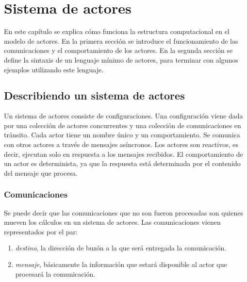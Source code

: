 \chapter{Sistema de actores}

\newcommand{\COMUNICACIONES}{\mathcal{K}}
\newcommand{\COMUNICACIONESSUB}{\mathsf{K}}

\newcommand{\COMUNICACION}{\bar{k}}
\newcommand{\BUZONES}{\mathcal{B}}
\newcommand{\BUZONESSUB}{\mathsf{B}}
\newcommand{\BUZON}{\beta}
\newcommand{\MENSAJES}{\mathcal{M}}
\newcommand{\MENSAJE}{m}

\newcommand{\ACTOR}{\alpha}
\newcommand{\COMPORTAMIENTOS}{\mathcal{C}}
\newcommand{\COMPORTAMIENTOSSUB}{\mathsf{C}}

\newcommand{\COMPORTAMIENTO}{c}
\newcommand{\COMNOPROC}{\kappa}

En este capítulo se explica cómo funciona la estructura computacional en el modelo de actores. En la primera sección se introduce el funcionamiento de las comunicaciones y el comportamiento de los actores. En la segunda sección se define la sintaxis de un lenguaje mínimo de actores, para terminar con algunos ejemplos utilizando este lenguaje.

\section{Describiendo un sistema de actores}
Un sistema de actores consiste de configuraciones. Una configuración viene dada por una colección de actores concurrentes y una colección de comunicaciones en tránsito. Cada actor tiene un nombre único y un comportamiento. Se comunica con otros actores a través de mensajes asíncronos. Los actores son reactivos, es decir, ejecutan solo en respuesta a los mensajes recibidos. El comportamiento de un actor es determinista, ya que la respuesta está determinada por el contenido del mensaje que procesa. 

\subsection{Comunicaciones}

Se puede decir que las comunicaciones que no son fueron procesadas son quienes mueven los cálculos en un sistema de actores. Las comunicaciones vienen representados por el par:

\begin{enumerate}
\item \textit{destino}, la dirección de buzón a la que será entregada la comunicación. 
\item \textit{mensaje}, básicamente la información que estará disponible al actor que procesará la comunicación.
\end{enumerate}

